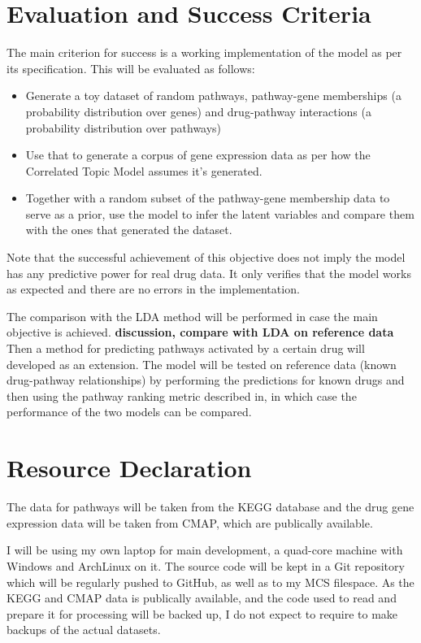\documentclass[12pt,a4]{article}
\begin{document}
\section*{Evaluation and Success Criteria}

The main criterion for success is a working implementation of the model as per its specification. This will be evaluated as follows:
\begin{itemize} 
\item Generate a toy dataset of random pathways, pathway-gene memberships (a probability distribution over genes) and drug-pathway interactions (a probability distribution over pathways)
\item Use that to generate a corpus of gene expression data as per how the Correlated Topic Model assumes it's generated.
\item Together with a random subset of the pathway-gene membership data to serve as a prior, use the model to infer the latent variables and compare them with the ones that generated the dataset.
\end{itemize}

Note that the successful achievement of this objective does not imply the model has any predictive power for real drug data. It only verifies that the model works as expected and there are no errors in the implementation.

The comparison with the LDA method will be performed in case the main objective is achieved. \textbf{discussion, compare with LDA on reference data} Then a method for predicting pathways activated by a certain drug will developed as an extension. The model will be tested on reference data (known drug-pathway relationships) by performing the predictions for known drugs and then using the pathway ranking metric described in\cite{Pratanwanich2014}, in which case the performance of the two models can be compared.

\section*{Resource Declaration}

The data for pathways will be taken from the KEGG\cite{KEGG} database and the drug gene expression data will be taken from CMAP\cite{CMap}, which are publically available.

I will be using my own laptop for main development, a quad-core machine with Windows and ArchLinux on it. The source code will be kept in a Git repository which will be regularly pushed to GitHub, as well as to my MCS filespace. As the KEGG and CMAP data is publically available, and the code used to read and prepare it for processing will be backed up, I do not expect to require to make backups of the actual datasets.
\end{document}

